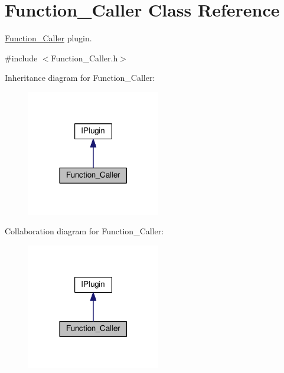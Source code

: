 \hypertarget{class_function___caller}{}\section{Function\+\_\+\+Caller Class Reference}
\label{class_function___caller}


\hyperlink{class_function___caller}{Function\+\_\+\+Caller} plugin.  




{\ttfamily \#include $<$Function\+\_\+\+Caller.\+h$>$}



Inheritance diagram for Function\+\_\+\+Caller\+:\nopagebreak
\begin{figure}[H]
\begin{center}
\leavevmode
\includegraphics[width=165pt]{class_function___caller__inherit__graph}
\end{center}
\end{figure}


Collaboration diagram for Function\+\_\+\+Caller\+:\nopagebreak
\begin{figure}[H]
\begin{center}
\leavevmode
\includegraphics[width=165pt]{class_function___caller__coll__graph}
\end{center}
\end{figure}
